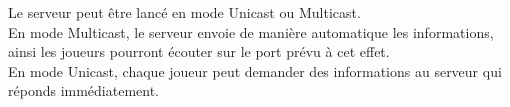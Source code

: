 \par

Le serveur peut être lancé en mode Unicast ou Multicast.\\
En mode Multicast, le serveur envoie de manière automatique les informations, ainsi les joueurs pourront écouter sur le port prévu à cet effet.\\
En mode Unicast, chaque joueur peut demander des informations au serveur qui réponds immédiatement. \\